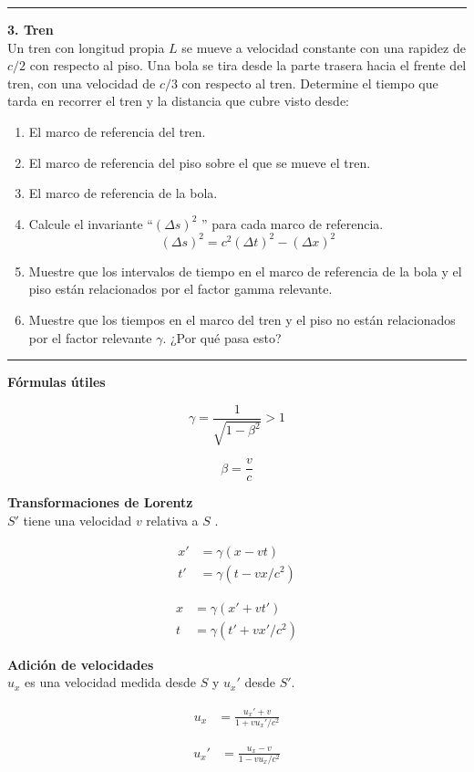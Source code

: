 \documentclass[12pt]{article}
\begin{document}
\noindent\rule{16.5cm}{0.4pt}


\textbf{3. Tren}\\

 Un tren con longitud propia $L$  se mueve a velocidad constante con una rapidez de $c/2$ con
 respecto al piso. Una bola se tira desde la parte trasera hacia el frente del tren, con una velocidad de $c/3$ con respecto al tren. Determine el tiempo que tarda en recorrer el tren y la distancia que cubre visto desde:

 \begin{enumerate}
	\item  El marco de referencia del tren.
	\item  El marco de referencia del piso sobre el que se mueve el tren.
	\item  El marco de referencia de la bola.
	\item  Calcule el invariante “$(\Delta s)^2$ ” para cada marco de referencia. 
	$$(\Delta s)^2 = c^2(\Delta t)^2 - (\Delta x)^2$$
	\item  Muestre que los intervalos de tiempo en el marco de referencia de la bola y el piso están relacionados por el factor gamma relevante.
	\item  Muestre que los tiempos en el marco del tren y el piso no están relacionados por el factor relevante $\gamma$. ¿Por qué pasa esto?
\end{enumerate} 


\noindent\rule{16.5cm}{0.4pt}

\textbf{Fórmulas útiles}

\begin{equation*}
\gamma = \frac{1}{\sqrt{1-\beta^2}} > 1
\end{equation*}

\begin{equation}
\beta = \frac{v}{c}
\end{equation}

\textbf{Transformaciones de Lorentz}\\
$S'$ tiene una velocidad $v$ relativa a $S$ .

\begin{align*}
x' &= \gamma(x -vt)\\
t' &= \gamma(t -vx/c^2)
\end{align*}


\begin{align*}
x &= \gamma(x' +vt')\\
t &= \gamma(t' +vx'/c^2)
\end{align*}

\textbf{Adición de velocidades}\\
$u_x$ es una velocidad medida desde $S$ y $u_x'$ desde $S'$. 

\begin{align*}
u_x &= \frac{u_x'+v}{1+vu_x'/c^2}
\end{align*}

\begin{align*}
u_x' &= \frac{u_x- v}{1-vu_x/c^2}
\end{align*}
\end{document}
